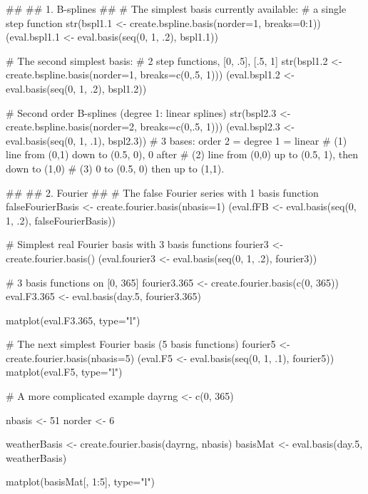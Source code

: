\begin{Examples}
\begin{ExampleCode}
##
## 1.  B-splines
## 
# The simplest basis currently available:
# a single step function  
str(bspl1.1 <- create.bspline.basis(norder=1, breaks=0:1))
(eval.bspl1.1 <- eval.basis(seq(0, 1, .2), bspl1.1))

# The second simplest basis:
# 2 step functions, [0, .5], [.5, 1]
str(bspl1.2 <- create.bspline.basis(norder=1, breaks=c(0,.5, 1)))
(eval.bspl1.2 <- eval.basis(seq(0, 1, .2), bspl1.2))

# Second order B-splines (degree 1:  linear splines) 
str(bspl2.3 <- create.bspline.basis(norder=2, breaks=c(0,.5, 1)))
(eval.bspl2.3 <- eval.basis(seq(0, 1, .1), bspl2.3))
# 3 bases:  order 2 = degree 1 = linear 
# (1) line from (0,1) down to (0.5, 0), 0 after
# (2) line from (0,0) up to (0.5, 1), then down to (1,0)
# (3) 0 to (0.5, 0) then up to (1,1).

##
## 2.  Fourier 
## 
# The false Fourier series with 1 basis function
falseFourierBasis <- create.fourier.basis(nbasis=1)
(eval.fFB <- eval.basis(seq(0, 1, .2), falseFourierBasis))

# Simplest real Fourier basis with 3 basis functions
fourier3 <- create.fourier.basis()
(eval.fourier3 <- eval.basis(seq(0, 1, .2), fourier3))

# 3 basis functions on [0, 365]
fourier3.365 <- create.fourier.basis(c(0, 365))
eval.F3.365 <- eval.basis(day.5, fourier3.365)

matplot(eval.F3.365, type="l")

# The next simplest Fourier basis (5  basis functions)
fourier5 <- create.fourier.basis(nbasis=5)
(eval.F5 <- eval.basis(seq(0, 1, .1), fourier5))
matplot(eval.F5, type="l")

# A more complicated example
dayrng <- c(0, 365) 

nbasis <- 51
norder <- 6 

weatherBasis <- create.fourier.basis(dayrng, nbasis)
basisMat <- eval.basis(day.5, weatherBasis) 

matplot(basisMat[, 1:5], type="l")

\end{ExampleCode}
\end{Examples}

